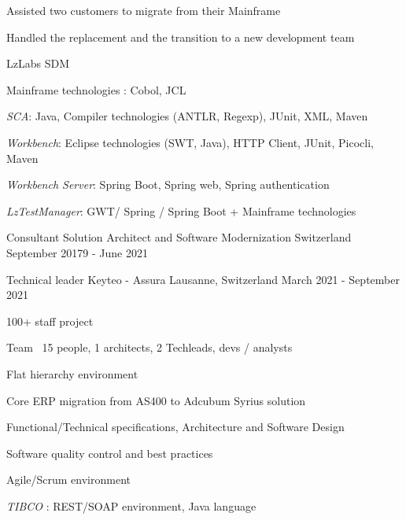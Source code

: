 \begin{cventries}
{{\begin{cvitems}
                \item {Assisted two customers to migrate from their Mainframe }
                \item {Handled the replacement and the transition to a new development team}
               \end{cvitems}
            }
            {
                \begin{cvitems} %
                    \item{LzLabs SDM}
                    \item{Mainframe technologies : Cobol, JCL}
                    \item{\emph{SCA}: Java, Compiler technologies (ANTLR, Regexp), JUnit, XML, Maven}
                    \item{\emph{Workbench}: Eclipse technologies (SWT, Java), HTTP Client, JUnit, Picocli, Maven}
                    \item{\emph{Workbench Server}: Spring Boot, Spring web, Spring authentication}
                    \item{\emph{LzTestManager}: GWT/ Spring / Spring Boot + Mainframe technologies}
                \end{cvitems}
            }            
    }

    \cventry
    {Consultant} %
    {Solution Architect and Software Modernization} %
    {Switzerland} %
    {September 20179 - June 2021} %
    {}%

    \cventry
    {Technical leader} %
    {Keyteo - Assura} %
    {Lausanne, Switzerland} %
    {March 2021 - September 2021} %
    {
        \experience
        {
        \begin{cvitems} %
            \item{100+ staff project}
            \item{Team ~15 people, 1 architects, 2 Techleads, devs / analysts}
            \item{Flat hierarchy environment}
            \item{Core ERP migration from AS400 to Adcubum Syrius solution}
        \end{cvitems}
        }
        {
        \begin{cvitems} %
            \item{Functional/Technical specifications, Architecture and Software Design}
            \item{Software quality control and best practices}
            \item{Agile/Scrum environment}
        \end{cvitems}
        }
        {
        \begin{cvitems} %
            \item{\emph{TIBCO} : REST/SOAP environment, Java language}
        \end{cvitems}
        }
    }
    

\end{cventries}
